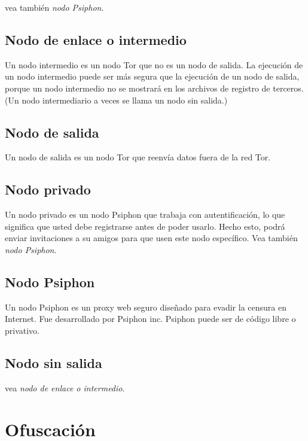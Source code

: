 vea también \emph{nodo Psiphon}.

\subsection{Nodo de enlace o
intermedio}\label{nodo-de-enlace-o-intermedio}

Un nodo intermedio es un nodo Tor que no es un nodo de salida. La
ejecución de un nodo intermedio puede ser más segura que la ejecución de
un nodo de salida, porque un nodo intermedio no se mostrará en los
archivos de registro de terceros. (Un nodo intermediario a veces se
llama un nodo sin salida.)

\subsection{Nodo de salida}\label{nodo-de-salida}

Un nodo de salida es un nodo Tor que reenvía datos fuera de la red Tor.

\subsection{Nodo privado}\label{nodo-privado}

Un nodo privado es un nodo Psiphon que trabaja con autentificación, lo
que significa que usted debe registrarse antes de poder usarlo. Hecho
esto, podrá enviar invitaciones a su amigos para que usen este nodo
específico. Vea también \emph{nodo Psiphon}.

\subsection{Nodo Psiphon}\label{nodo-psiphon}

Un nodo Psiphon es un proxy web seguro diseñado para evadir la censura
en Internet. Fue desarrollado por Psiphon inc. Psiphon puede ser de
código libre o privativo.

\subsection{Nodo sin salida}\label{nodo-sin-salida}

vea \emph{nodo de enlace o intermedio}.

\section{Ofuscación}\label{ofuscaciuxf3n}

